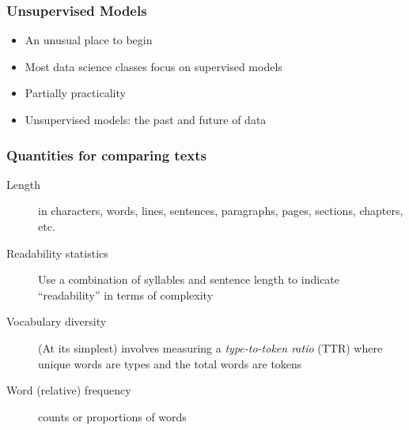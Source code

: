 \documentclass{beamer}
\begin{document}
	

  

\begin{frame}
	\frametitle{Unsupervised Models}
	\begin{itemize}
		\item An unusual place to begin \pause 
		\item Most data science classes focus on supervised models \pause 
		\item Partially practicality \pause 
		\item Unsupervised models: the past and future of data
	\end{itemize} 
\end{frame}











\begin{frame}
	\frametitle{Quantities for comparing texts}
	\begin{description}
		\item[Length] in characters, words, lines, sentences, paragraphs,
		pages, sections, chapters, etc.
		\item[Readability statistics]  Use a combination of syllables and
		sentence length to indicate ``readability'' in terms of complexity
		\item[Vocabulary diversity] (At its simplest) involves measuring a
		\emph{type-to-token ratio} (TTR) where unique words are types and
		the total words are tokens
		\item[Word (relative) frequency] counts or proportions of words
		
	\end{description}
\end{frame}
\end{document}
